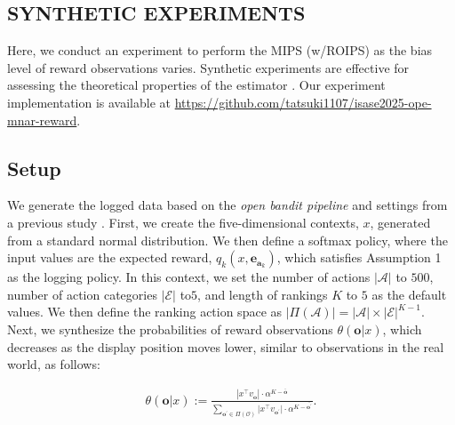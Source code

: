 \documentclass[a4paper,10pt]{article} %
\begin{document}
\begin{multicols}{2}
\section{SYNTHETIC EXPERIMENTS}
Here, we conduct an experiment to perform the MIPS (w/ROIPS) as the bias level of reward observations varies. Synthetic experiments are effective for assessing the theoretical properties of the estimator \cite{saito2020unbiased,saito2022off}. Our experiment implementation is available at \href{https://github.com/tatsuki1107/isase2025-ope-mnar-reward}{https://github.com/tatsuki1107/isase2025-ope-mnar-reward}. 

\subsection{Setup} We generate the logged data based on the \textit{open bandit pipeline} \cite{saito2020open} and settings from a previous study \cite{saito2022off}. First, we create the five-dimensional contexts, \( x \), generated from a standard normal distribution. We then define a softmax policy, where the input values are the expected reward, \( q_{k}(x,\boldsymbol{e}_{\boldsymbol{a}_k}) \), which satisfies Assumption 1 as the logging policy. In this context, we set the number of actions \( |\mathcal{A}| \) to \(500\), number of action categories \( |\mathcal{E}|\) to\( 5 \), and length of rankings \( K \) to \( 5 \) as the default values. We then define the ranking action space as \( |\Pi(\mathcal{A})| = |\mathcal{A}| \times |\mathcal{E}|^{K-1}  \). Next, we synthesize the probabilities of reward observations \( \theta(\boldsymbol{o}|x) \), which decreases as the display position moves lower, similar to observations in the real world, as follows: 

\vspace{-5mm}
\begin{align*}
    \theta(\boldsymbol{o}|x) := \frac{|x^{\top} v_{\boldsymbol{o}}| \cdot \alpha^{K - \bar{\boldsymbol{o}}}}{\sum_{\boldsymbol{o}^{\prime} \in \Pi(\mathcal{O})} |x^{\top} v_{\boldsymbol{o}^{\prime}}| \cdot \alpha^{K - \bar{\boldsymbol{o}^{\prime}}}}.
\end{align*}
\vspace{-3mm}


\end{multicols}
\end{document}
